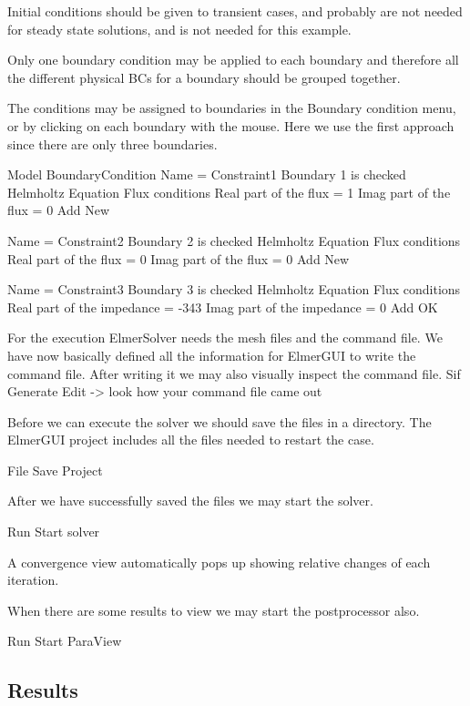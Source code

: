 Initial conditions should be given to transient cases, and probably are not needed for steady state solutions, and is not needed for this example.

Only one boundary condition may be applied to each boundary and therefore all the different physical BCs for a boundary should be grouped together. 

The conditions may be assigned to boundaries in the Boundary condition menu, or by clicking on each boundary with the mouse. Here we use the first approach since there are only three boundaries.

\ttbegin
Model
  BoundaryCondition
    Name = Constraint1
    Boundary 1 is checked
    Helmholtz Equation
      Flux conditions
        Real part of the flux = 1
        Imag part of the flux = 0
    Add
    New

    Name = Constraint2
    Boundary 2 is checked
    Helmholtz Equation
      Flux conditions
        Real part of the flux = 0
        Imag part of the flux = 0
    Add
    New

    Name = Constraint3
    Boundary 3 is checked
    Helmholtz Equation
      Flux conditions
        Real part of the impedance = -343
        Imag part of the impedance = 0
    Add
   OK 
\ttend   

For the execution ElmerSolver needs the mesh files and the command file.  We have now basically defined all the information for ElmerGUI to write the command file. After writing it we may also visually inspect the command file.
\ttbegin
Sif 
  Generate
  Edit -> look how your command file came out  
\ttend

Before we can execute the solver we should save the files in a directory.  The ElmerGUI project includes all the files needed to restart the case.

\ttbegin
File 
  Save Project
\ttend

After we have successfully saved the files we may start the solver.

\ttbegin
Run
  Start solver
\ttend

A convergence view automatically pops up showing relative changes of each iteration.

When there are some results to view we may start the postprocessor also.

\ttbegin
Run
  Start ParaView
\ttend

\subsection*{Results}


